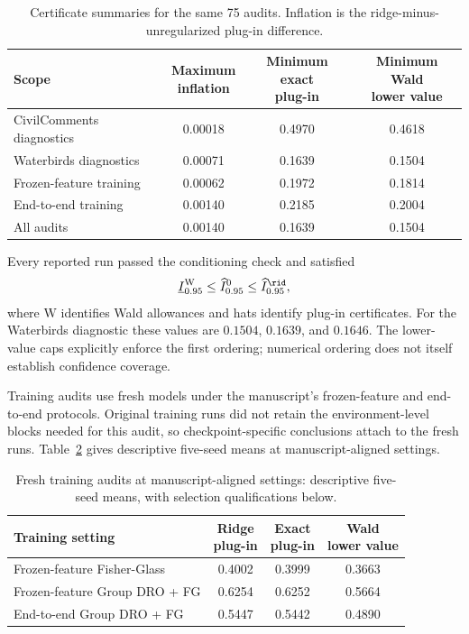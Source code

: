 \begin{table}[htbp]
\centering
\caption{Certificate summaries for the same 75 audits. Inflation is the ridge-minus-unregularized plug-in difference.}
\label{tab:appB-certificates}
\small
\begin{tabular}{@{}p{.35\linewidth}ccc@{}}
\toprule
Scope & \shortstack{Maximum\\inflation} & \shortstack{Minimum exact\\plug-in} & \shortstack{Minimum Wald\\lower value}\\
\midrule
CivilComments diagnostics & 0.00018 & 0.4970 & 0.4618\\
Waterbirds diagnostics & 0.00071 & 0.1639 & 0.1504\\
Frozen-feature training & 0.00062 & 0.1972 & 0.1814\\
End-to-end training & 0.00140 & 0.2185 & 0.2004\\
\midrule
All audits & 0.00140 & 0.1639 & 0.1504\\
\bottomrule
\end{tabular}
\end{table}

Every reported run passed the conditioning check and satisfied
\begin{equation}
\underline I_{0.95}^{\mathrm W}\le\widehat I_{0.95}^{0}\le\widehat I_{0.95}^{\rid},
\label{eq:appB-observed-ordering}
\end{equation}
where $\mathrm W$ identifies Wald allowances and hats identify plug-in certificates. For the Waterbirds diagnostic these values are $0.1504$, $0.1639$, and $0.1646$. The lower-value caps explicitly enforce the first ordering; numerical ordering does not itself establish confidence coverage.

Training audits use fresh models under the manuscript's frozen-feature and end-to-end protocols. Original training runs did not retain the environment-level blocks needed for this audit, so checkpoint-specific conclusions attach to the fresh runs. Table~\ref{tab:appB-training} gives descriptive five-seed means at manuscript-aligned settings.

\begin{table}[htbp]
\centering
\caption{Fresh training audits at manuscript-aligned settings: descriptive five-seed means, with selection qualifications below.}
\label{tab:appB-training}
\small
\begin{tabular}{@{}p{.43\linewidth}ccc@{}}
\toprule
Training setting & \shortstack{Ridge\\plug-in} & \shortstack{Exact\\plug-in} & \shortstack{Wald\\lower value}\\
\midrule
Frozen-feature Fisher-Glass & 0.4002 & 0.3999 & 0.3663\\
Frozen-feature Group DRO + FG & 0.6254 & 0.6252 & 0.5664\\
End-to-end Group DRO + FG & 0.5447 & 0.5442 & 0.4890\\
\bottomrule
\end{tabular}
\end{table}

